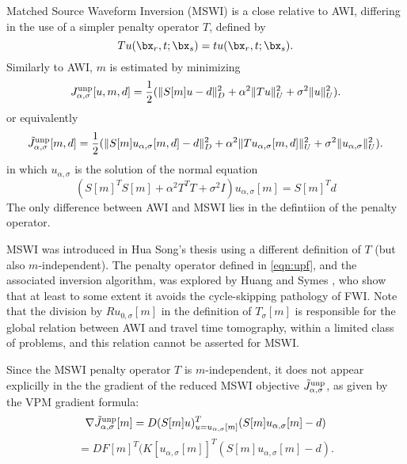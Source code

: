 Matched Source Waveform Inversion (MSWI) is a close relative to
AWI, differing in the use of a simpler penalty operator $T$, defined
by
\begin{equation}
  \label{eqn:upf}
  Tu (\bx_r,t;\bx_s) = t u(\bx_r,t;\bx_s).
\end{equation}
Similarly to AWI, $m$ is estimated by minimizing
\begin{equation}
  \label{eqn:junp}
 J^{\rm unp}_{\alpha,\sigma}[u,m,d] = \frac{1}{2}(\|S[m]u - d\|_D^2 + \alpha^2\|Tu\|_U^2 + \sigma^2 \|u\|^2_U).
\end{equation}
or equivalently
\begin{equation}
  \label{eqn:jtildeunp}
 \tilde{J}^{\rm unp}_{\alpha,\sigma}[m,d] = \frac{1}{2}(\|S[m]u_{\alpha,\sigma}[m,d] - d\|_D^2 + \alpha^2\|Tu_{\alpha,\sigma}[m,d]\|_U^2 + \sigma^2 \|u_{\alpha,\sigma}\|^2_U).
\end{equation}
in which $u_{\alpha,\sigma}$ is the solution of the normal equation
\begin{equation}
  \label{eqn:normalunp}
  (S[m]^TS[m] + \alpha^2T^TT + \sigma^2I)u_{\alpha,\sigma}[m] = S[m]^Td
\end{equation}
The only difference between AWI and MSWI lies in the defintiion of the
penalty operator.

MSWI was introduced in Hua Song's thesis
\cite[]{Song:94c} using a different definition of $T$ (but also
$m$-independent). The penalty operator defined in \ref{eqn:upf}, and
the associated inversion algorithm, was explored by Huang and Symes
\cite[]{HuangSymes2015SEG,HuangSymes:Geo17}, who show that at least to
some extent it avoids the cycle-skipping pathology of FWI. Note that
the division by $Ru_{0,\sigma}[m]$ in the definition of
$T_{\sigma}[m]$ is responsible for the global relation between AWI and
travel time tomography, within a limited class of problems, and this
relation cannot be asserted for MSWI.

Since the MSWI penalty operator $T$ is $m$-independent, it does not
appear explicilly in the the gradient
of the reduced MSWI objective $\tilde{J}^{\rm unp}_{\alpha,\sigma}$, as
given by the VPM gradient formula:
\[
  \nabla \tilde{J}^{\rm unp}_{\alpha,\sigma}[m] =
  D(S[m]u)^T_{u=u_{\alpha,\sigma}[m]}(S[m]u_{\alpha,\sigma}[m]-d)
\]
\begin{equation}
  \label{eqn:tildejunpgrad}
  = DF[m]^T(K[u_{\alpha,\sigma}[m]]^T(S[m]u_{\alpha,\sigma}[m]-d).
\end{equation}

